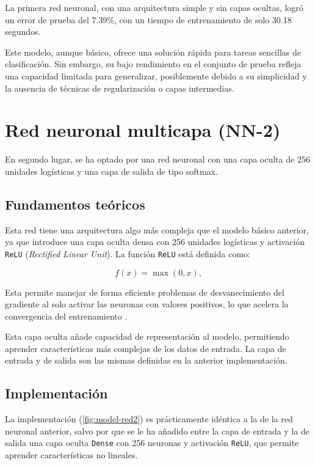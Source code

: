 La primera red neuronal, con una arquitectura simple y sin capas ocultas, logró un error de prueba del 7.39\%, con un tiempo de entrenamiento de solo 30.18 segundos.

Este modelo, aunque básico, ofrece una solución rápida para tareas sencillas de clasificación. Sin embargo, su bajo rendimiento en el conjunto de prueba refleja una capacidad limitada para generalizar, posiblemente debido a su simplicidad y la ausencia de técnicas de regularización o capas intermedias.

\section{Red neuronal multicapa (NN-2)}

En segundo lugar, se ha optado por una red neuronal con una capa oculta de 256 unidades logísticas y una capa de salida de tipo softmax.

\subsection{Fundamentos teóricos}

Esta red tiene una arquitectura algo más compleja que el modelo básico anterior, ya que introduce una capa oculta densa con 256 unidades logísticas y activación \texttt{ReLU} (\textit{Rectified Linear Unit}). La función \texttt{ReLU} está definida como:

\[
f(x) = \max(0, x),
\]

Esta permite manejar de forma eficiente problemas de desvanecimiento del gradiente al solo activar las neuronas con valores positivos, lo que acelera la convergencia del entrenamiento \parencite{nair2010relu}.

Esta capa oculta añade capacidad de representación al modelo, permitiendo aprender características más complejas de los datos de entrada. La capa de entrada y de salida son las mismas definidas en la anterior implementación.


\subsection{Implementación}

La implementación (\autoref{fig:model-red2}) es prácticamente idéntica a la de la red neuronal anterior, salvo por que se le ha añadido entre la capa de entrada y la de salida una capa oculta \texttt{Dense} con 256 neuronas y activación \texttt{ReLU}, que permite aprender características no lineales.

